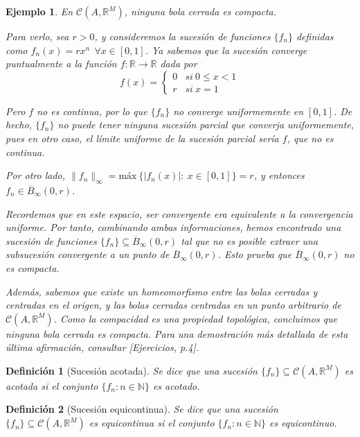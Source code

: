 \documentclass[11pt, a4paper]{article}
\newif\IfInSansMode
\newcommand{\fn}{\{f_n\}}
\theoremstyle{theorem-style}
\theoremstyle{definition-style}
\newtheorem{ndef}{Definición}[section]
\theoremstyle{remark-style}
\theoremstyle{example-style}
\newtheorem{ejemplo}{Ejemplo}[section]
\begin{document}
\begin{ejemplo} En $\mathcal{C}(A,\mathbb{R}^M)$, ninguna bola cerrada es compacta.

  Para verlo, sea $r>0$, y consideremos la sucesión de funciones $\fn$ definidas como $f_n(x) = rx^n \ \ \forall x \in [0,1]$. Ya sabemos que la sucesión converge puntualmente a la función $f: \mathbb{R} \to \mathbb{R}$ dada por $$f(x) = \begin{cases} 0 & si\ 0 \le x < 1\\ r & si\ x = 1 \end{cases}$$

  Pero $f$ no es continua, por lo que $\fn$ no converge uniformemente en $[0,1]$. De hecho, $\fn$ no puede tener ninguna sucesión parcial que converja uniformemente, pues en otro caso, el límite uniforme de la sucesión parcial sería $f$, que no es continua.

  Por otro lado, $\|f_n\|_{\infty} = \text{máx} \ \{ |f_n(x)|:\ x \in [0,1]\} = r$, y entonces $f_n \in \overline{B}_{\infty}(0,r)$. 

  Recordemos que en este espacio, ser convergente era equivalente a la convergencia uniforme. Por tanto, combinando ambas informaciones, hemos encontrado una sucesión de funciones $\fn \subseteq \overline{B}_{\infty}(0,r)$ tal que no es posible extraer una subsucesión convergente a un punto de $\overline{B}_{\infty}(0,r)$. Esto prueba que $\overline{B}_{\infty}(0,r)$ no es compacta.

  Además, sabemos que existe un homeomorfismo entre las bolas cerradas y centradas en el origen, y las bolas cerradas centradas en un punto arbitrario de $\mathcal{C}(A,\mathbb{R}^M)$. Como la compacidad es una propiedad topológica, concluimos que ninguna bola cerrada es compacta. Para una demostración más detallada de esta última afirmación, consultar \textit{[Ejercicios, p.4]}.
\end{ejemplo}

\begin{ndef}[Sucesión acotada]
  Se dice que una sucesión $\fn \subseteq \mathcal{C}(A,\mathbb{R}^M)$ es acotada si el conjunto $\{ f_n: n \in \mathbb{N}\}$ es acotado. 
\end{ndef}

\begin{ndef}[Sucesión equicontinua]
  Se dice que una sucesión $\fn \subseteq \mathcal{C}(A,\mathbb{R}^M)$ es equicontinua si el conjunto $\{ f_n: n \in \mathbb{N}\}$ es equicontinuo. 
\end{ndef}
\end{document}
